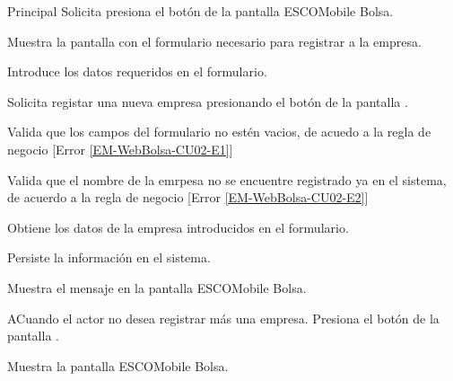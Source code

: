 \begin{UCtrayectoria}{Principal}
	\UCpaso [\UCactor] Solicita presiona el botón  de la pantalla ESCOMobile Bolsa. 

	\UCpaso Muestra la pantalla  con el formulario necesario para registrar a la empresa. 

	\UCpaso [\UCactor] Introduce los datos requeridos en el formulario. 

	\UCpaso [\UCactor] Solicita registar una nueva empresa presionando el botón  de la pantalla .  

	\UCpaso Valida que los campos del formulario no estén vacios, de acuedo a la regla de negocio  [Error \ref{EM-WebBolsa-CU02-E1}] 

	\UCpaso Valida que el nombre de la emrpesa no se encuentre registrado ya en el sistema, de acuerdo a la regla de negocio  [Error \ref{EM-WebBolsa-CU02-E2}] 
	
	\UCpaso Obtiene los datos de la empresa introducidos en el formulario. 

	\UCpaso Persiste la información en el sistema.

	\UCpaso Muestra el mensaje  en la pantalla ESCOMobile Bolsa.  
\end{UCtrayectoria}

\begin{UCtrayectoriaA}{A}{Cuando el actor no desea registrar más una empresa.}
	\UCpaso [\UCactor] Presiona el botón  de la pantalla . 

	\UCpaso Muestra la pantalla ESCOMobile Bolsa.  
\end{UCtrayectoriaA}


